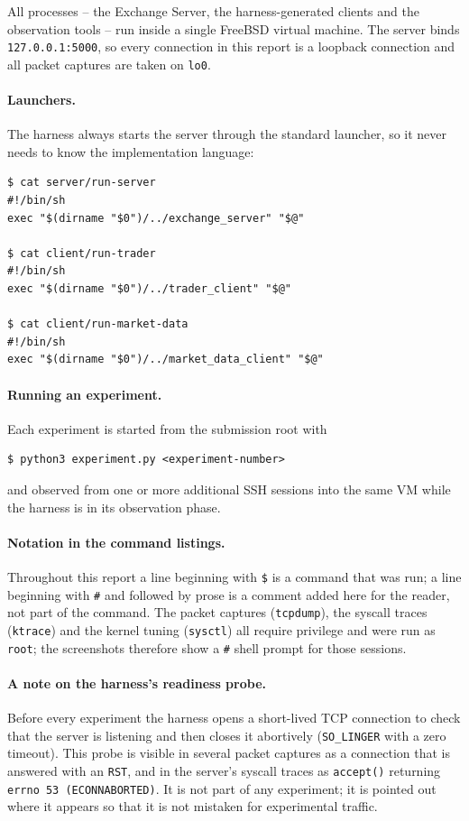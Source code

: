 \documentclass[11pt,a4paper]{article}
\begin{document}
All processes -- the Exchange Server, the harness-generated clients and the
observation tools -- run inside a single FreeBSD virtual machine.  The server binds
\texttt{127.0.0.1:5000}, so every connection in this report is a loopback connection
and all packet captures are taken on \texttt{lo0}.

\paragraph{Launchers.}  The harness always starts the server through the standard
launcher, so it never needs to know the implementation language:

\begin{lstlisting}
$ cat server/run-server
#!/bin/sh
exec "$(dirname "$0")/../exchange_server" "$@"

$ cat client/run-trader
#!/bin/sh
exec "$(dirname "$0")/../trader_client" "$@"

$ cat client/run-market-data
#!/bin/sh
exec "$(dirname "$0")/../market_data_client" "$@"
\end{lstlisting}

\paragraph{Running an experiment.}  Each experiment is started from the submission
root with

\begin{lstlisting}
$ python3 experiment.py <experiment-number>
\end{lstlisting}

and observed from one or more additional SSH sessions into the same VM while the
harness is in its observation phase.

\paragraph{Notation in the command listings.}  Throughout this report a line beginning
with \texttt{\$} is a command that was run; a line beginning with \texttt{\#} and
followed by prose is a comment added here for the reader, not part of the command.  The
packet captures (\texttt{tcpdump}), the syscall traces (\texttt{ktrace}) and the kernel
tuning (\texttt{sysctl}) all require privilege and were run as \texttt{root}; the
screenshots therefore show a \texttt{\#} shell prompt for those sessions.

\paragraph{A note on the harness's readiness probe.}  Before every experiment the
harness opens a short-lived TCP connection to check that the server is listening and
then closes it abortively (\texttt{SO\_LINGER} with a zero timeout).  This probe is
visible in several packet captures as a connection that is answered with an
\texttt{RST}, and in the server's syscall traces as
\texttt{accept()} returning \texttt{errno 53 (ECONNABORTED)}.  It is not part of any
experiment; it is pointed out where it appears so that it is not mistaken for
experimental traffic.
\end{document}
